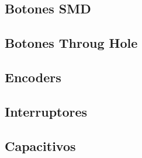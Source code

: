 
\subsection{Botones SMD}


\subsection{Botones Throug Hole}


\subsection{Encoders}


\subsection{Interruptores}


\subsection{Capacitivos}
